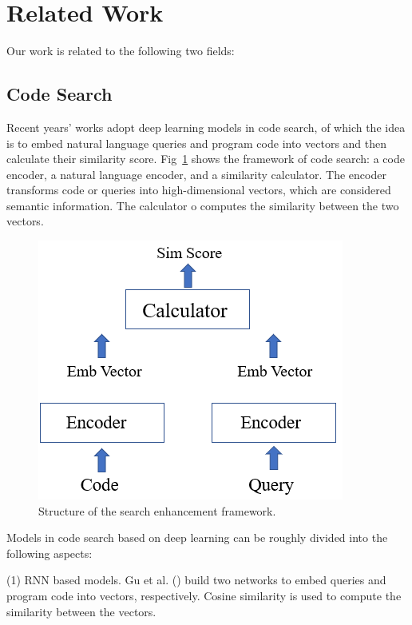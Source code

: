 
\section{Related Work}

Our work is related to the following two fields: 

\subsection{Code Search}

Recent years’ works adopt deep learning models in code search, of which the idea is to embed natural language queries and program code into vectors and then calculate their similarity score. 
Fig~\ref{fig:cs_frame} shows the framework of code search: a code encoder, a natural language encoder, and a similarity calculator. The encoder transforms code or queries into high-dimensional vectors, which are considered semantic information. The calculator o computes the similarity between the two vectors. 

\begin{figure}[htb]
	\centering
	\includegraphics[width=0.8\linewidth]{imgs/code_search_framework.png}
	\caption{Structure of the search enhancement framework.}
	\label{fig:cs_frame}
\end{figure}

Models in code search based on deep learning can be roughly 
divided into the following aspects:

(1) RNN based models. Gu et al. (\citealp{DeepCS})
build two networks to embed queries and program code into vectors, respectively. 
Cosine similarity is used to compute the similarity between the vectors. 

